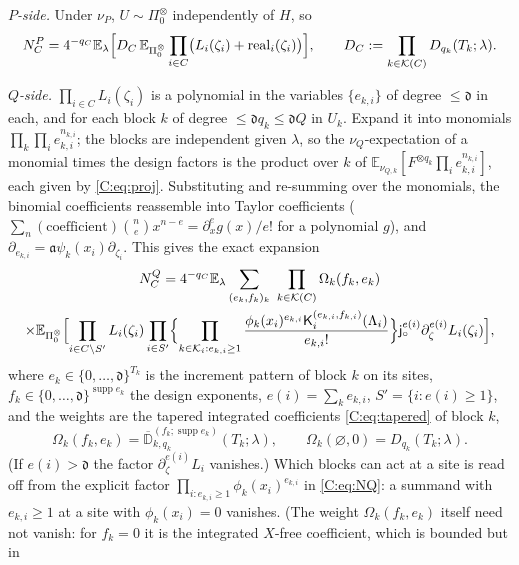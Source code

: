 \documentclass[11pt]{article}
\newcommand{\E}{\mathbb{E}}
\newcommand{\cK}{\mathcal{K}}
\newcommand{\jsh}{\mathsf{j}_\circ}
\newcommand{\dg}{\mathfrak{d}}
\newcommand{\K}{\mathsf{K}}
\newcommand{\real}{\mathrm{real}}
\begin{document}
\emph{\(P\)-side.}  Under \(\nu_P\), \(U\sim\Pi_0^{\otimes}\) independently of
\(H\), so
\begin{equation}
 N^P_C=4^{-q_C}\E_\lambda\Bigl[D_C\,\E_{\Pi_0^\otimes}\prod_{i\in C}\bigl(L_i(\zeta_i)+\real_i(\zeta_i)\bigr)\Bigr],
 \qquad D_C:=\prod_{k\in\cK(C)}D_{q_k}(T_k;\lambda).
 \label{C:eq:NP}
\end{equation}

\emph{\(Q\)-side.}  \(\prod_{i\in C}L_i(\zeta_i)\) is a polynomial in the
variables \(\{e_{k,i}\}\) of degree \(\le\dg\) in each, and for each block
\(k\) of degree \(\le\dg q_k\le\dg Q\) in \(U_k\).  Expand it into monomials
\(\prod_k\prod_ie_{k,i}^{n_{k,i}}\); the blocks are independent given
\(\lambda\), so the \(\nu_Q\)-expectation of a monomial times the design
factors is the product over \(k\) of
\(\E_{\nu_{Q,k}}[F^{\otimes q_k}\prod_ie_{k,i}^{n_{k,i}}]\), each given by
\eqref{C:eq:proj}.  Substituting and re-summing over the monomials, the
binomial coefficients reassemble into Taylor coefficients
(\(\sum_n(\text{coefficient})\binom{n}{e}x^{n-e}=\partial_x^eg(x)/e!\) for a
polynomial \(g\)), and \(\partial_{e_{k,i}}=\mathfrak a\psi_k(x_i)\partial_{\zeta_i}\).
This gives the exact expansion
\begin{multline}
 N^Q_C=4^{-q_C}\E_\lambda\sum_{(e_k,f_k)_k}\ \prod_{k\in\cK(C)}\Omega_k(f_k,e_k)\\
 \times\E_{\Pi_0^\otimes}\Bigl[\prod_{i\in C\setminus S'}L_i(\zeta_i)\prod_{i\in S'}
 \Bigl\{\prod_{k\in\cK_i:e_{k,i}\ge1}\frac{\phi_k(x_i)^{e_{k,i}}\K_i^{(e_{k,i},f_{k,i})}(\Lambda_i)}{e_{k,i}!}\Bigr\}
 \jsh^{e(i)}\partial_\zeta^{e(i)}L_i(\zeta_i)\Bigr],
 \label{C:eq:NQ}
\end{multline}
where \(e_k\in\{0,\dots,\dg\}^{T_k}\) is the increment pattern of block
\(k\) on its sites, \(f_k\in\{0,\dots,\dg\}^{\operatorname{supp}e_k}\) the
design exponents, \(e(i)=\sum_ke_{k,i}\), \(S'=\{i:e(i)\ge1\}\), and the
weights are the tapered integrated coefficients \eqref{C:eq:tapered} of
block \(k\),
\[
 \Omega_k(f_k,e_k)=\overline{\mathbb D}^{(f_k;\operatorname{supp}e_k)}_{k,q_k}(T_k;\lambda),
 \qquad \Omega_k(\varnothing,0)=D_{q_k}(T_k;\lambda).
\]
(If \(e(i)>\dg\) the factor \(\partial_\zeta^{e(i)}L_i\) vanishes.)
Which blocks can act at a site is read off from the explicit factor
\(\prod_{i:e_{k,i}\ge1}\phi_k(x_i)^{e_{k,i}}\) in \eqref{C:eq:NQ}: a
summand with \(e_{k,i}\ge1\) at a site with \(\phi_k(x_i)=0\) vanishes.
(The weight \(\Omega_k(f_k,e_k)\) itself need not vanish: for \(f_k=0\) it
is the integrated \(X\)-free coefficient, which is bounded but in
\end{document}
